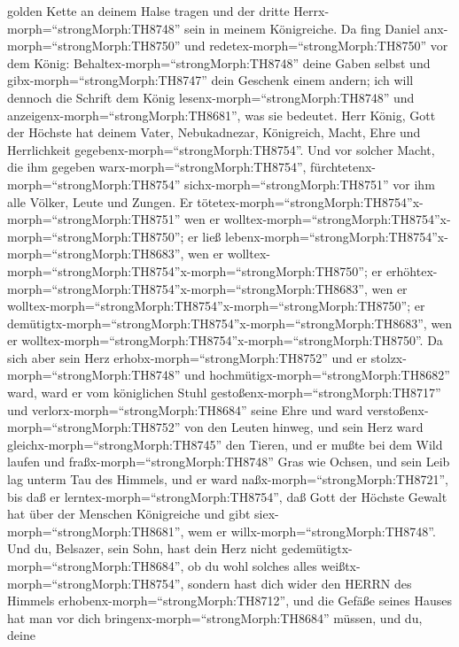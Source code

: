 golden Kette an deinem Halse tragen und der dritte
Herrx-morph=``strongMorph:TH8748'' sein in meinem Königreiche.
 Da fing Daniel anx-morph=``strongMorph:TH8750'' und
redetex-morph=``strongMorph:TH8750'' vor dem König:
Behaltex-morph=``strongMorph:TH8748'' deine Gaben selbst und
gibx-morph=``strongMorph:TH8747'' dein Geschenk einem andern; ich will
dennoch die Schrift dem König lesenx-morph=``strongMorph:TH8748'' und
anzeigenx-morph=``strongMorph:TH8681'', was sie bedeutet. 
Herr König, Gott der Höchste hat deinem Vater, Nebukadnezar, Königreich,
Macht, Ehre und Herrlichkeit gegebenx-morph=``strongMorph:TH8754''.
 Und vor solcher Macht, die ihm gegeben
warx-morph=``strongMorph:TH8754'',
fürchtetenx-morph=``strongMorph:TH8754''
sichx-morph=``strongMorph:TH8751'' vor ihm alle Völker, Leute und
Zungen. Er
tötetex-morph=``strongMorph:TH8754''x-morph=``strongMorph:TH8751'' wen
er wolltex-morph=``strongMorph:TH8754''x-morph=``strongMorph:TH8750'';
er ließ
lebenx-morph=``strongMorph:TH8754''x-morph=``strongMorph:TH8683'', wen
er wolltex-morph=``strongMorph:TH8754''x-morph=``strongMorph:TH8750'';
er erhöhtex-morph=``strongMorph:TH8754''x-morph=``strongMorph:TH8683'',
wen er
wolltex-morph=``strongMorph:TH8754''x-morph=``strongMorph:TH8750''; er
demütigtx-morph=``strongMorph:TH8754''x-morph=``strongMorph:TH8683'',
wen er
wolltex-morph=``strongMorph:TH8754''x-morph=``strongMorph:TH8750''.
 Da sich aber sein Herz erhobx-morph=``strongMorph:TH8752''
und er stolzx-morph=``strongMorph:TH8748'' und
hochmütigx-morph=``strongMorph:TH8682'' ward, ward er vom königlichen
Stuhl gestoßenx-morph=``strongMorph:TH8717'' und
verlorx-morph=``strongMorph:TH8684'' seine Ehre  und ward
verstoßenx-morph=``strongMorph:TH8752'' von den Leuten hinweg, und sein
Herz ward gleichx-morph=``strongMorph:TH8745'' den Tieren, und er mußte
bei dem Wild laufen und fraßx-morph=``strongMorph:TH8748'' Gras wie
Ochsen, und sein Leib lag unterm Tau des Himmels, und er ward
naßx-morph=``strongMorph:TH8721'', bis daß er
lerntex-morph=``strongMorph:TH8754'', daß Gott der Höchste Gewalt hat
über der Menschen Königreiche und gibt
siex-morph=``strongMorph:TH8681'', wem er
willx-morph=``strongMorph:TH8748''.  Und du, Belsazer, sein
Sohn, hast dein Herz nicht gedemütigtx-morph=``strongMorph:TH8684'', ob
du wohl solches alles weißtx-morph=``strongMorph:TH8754'', 
sondern hast dich wider den HERRN des Himmels
erhobenx-morph=``strongMorph:TH8712'', und die Gefäße seines Hauses hat
man vor dich bringenx-morph=``strongMorph:TH8684'' müssen, und du, deine
